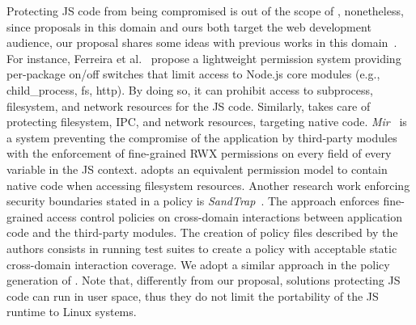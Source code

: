Protecting JS code from being compromised is out of the scope of \natisand,
nonetheless, since proposals in this domain and ours both target the
web development audience, our proposal shares some ideas with previous
works in this domain~\cite{vasilakis2021preventing, sandtrap,
  terrace2012javascript, ntousakis2021detecting}. For instance, Ferreira et al.~\cite{
  npm-malicious-update} propose a lightweight permission system providing
per-package on/off switches that limit access to Node.js core modules
(e.g., child\_process, fs, http). By doing so, it can prohibit access
to subprocess, filesystem, and network resources for the JS
code. Similarly, \natisand takes care of protecting filesystem, IPC, and
network resources, targeting native code. {\em Mir}~\cite{
  vasilakis2021preventing} is a system preventing the compromise of
the application by third-party modules with the enforcement of
fine-grained RWX permissions on every field of every variable in the
JS context. \natisand adopts an equivalent permission model to contain
native code when accessing filesystem resources. Another research work
enforcing security boundaries stated in a policy is {\em
  SandTrap}~\cite{sandtrap}. The approach enforces fine-grained
access control policies on cross-domain interactions between
application code and the third-party modules. The creation of policy
files described by the authors consists in running test suites to
create a policy with acceptable static cross-domain interaction
coverage. We adopt a similar approach in the policy generation of
\natisand. Note that, differently from our proposal, solutions protecting
JS code can run in user space, thus they do not limit the portability
of the JS runtime to Linux systems.

